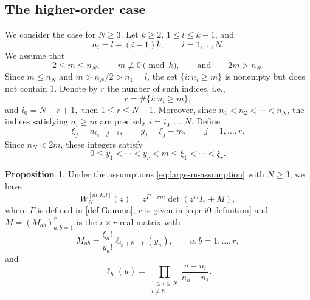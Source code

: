 \documentclass[preprint,3p,10pt]{elsarticle}
\theoremstyle{definition}
\newtheorem{proposition}[definition]{Proposition}
\begin{document}
\subsection{The higher-order case}
We consider the case for \(N\ge3\).   Let
\(k\ge2\), \(1\le l\le k-1\), and
\begin{equation}\label{eq:higher-order-ni}
    n_i=l+(i-1)k,\qquad i=1,\ldots,N.
\end{equation}
We assume that
\begin{equation}\label{eq:large-m-assumption}
    2\le m\le n_N,\qquad m\not\equiv0\pmod{k},\qquad\text{and} \qquad 2m>n_N.
\end{equation}
Since \(m\le n_N\) and \(m>n_N/2>n_1=l\), the set \(\{i:n_i\ge m\}\) is nonempty but does not contain \(1\). Denote by \(r\) the number of such indices, i.e.,
\begin{equation}\label{eq:r-i0-definition}
    r=\#\{i:n_i\ge m\},
\end{equation}
and
$i_0=N-r+1,$ then \(1\le r\le N-1\). Moreover, since \(n_1<n_2<\cdots<n_N\), the indices satisfying \(n_i\ge m\) are precisely \(i=i_0,\ldots,N\).
Define
\begin{equation}\label{eq:xi-y}
    \xi_j=n_{i_0+j-1},
    \qquad
    y_j=\xi_j-m,
    \qquad j=1,\ldots,r.
\end{equation}
Since \(n_N<2m\), these integers satisfy
\begin{equation}\label{eq:y-xi-separation-large-m}
    0\le y_1<\cdots<y_r<m\le \xi_1<\cdots<\xi_r.
\end{equation}



\begin{proposition}\label{prop:two-term-reduction}
Under the assumptions \eqref{eq:large-m-assumption} with $N\ge3$, we have
\begin{equation}\label{eq:two-term-factor}
    W_N^{[m,k,l]}(z)=z^{\Gamma-rm}\det(z^mI_r+M),
\end{equation}
where \(\Gamma\) is defined in
\eqref{def:Gamma},  \(r\) is given in \eqref{eq:r-i0-definition} and \(M=(M_{ab})_{a,b=1}^r\) is the  \(r\times r\)  real matrix with
\begin{equation}\label{eq:M-definition}
    M_{ab}
    =
    \frac{\xi_a!}{y_a!}\ell_{i_0+b-1}(y_a),
    \qquad a,b=1,\ldots,r,
\end{equation}
and
\begin{equation}
    \ell_h(u)
    =
    \prod_{\substack{1\le i\le N\\ i\ne h}}
    \frac{u-n_i}{n_h-n_i}.
\end{equation}
\end{proposition}
\end{document}
